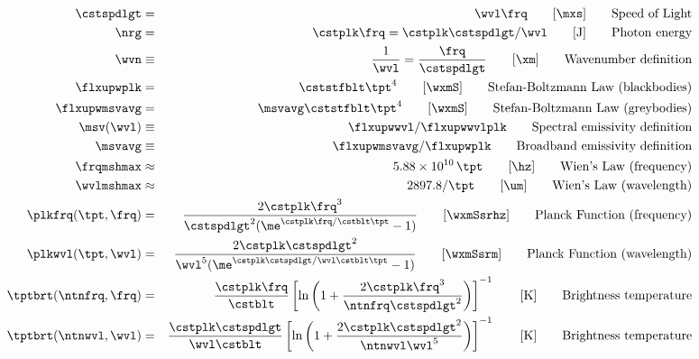 \documentclass[12pt]{article}
\begin{document}
\begin{eqnarray}
\cstspdlgt & = & \wvl \frq \qquad [\mbox{\mxs}] \qquad \mbox{Speed of Light} \nonumber \\ %
\nrg & = & \cstplk \frq = \cstplk \cstspdlgt / \wvl \qquad [\mbox{J}] \qquad \mbox{Photon energy} \nonumber \\ %
\wvn & \equiv & \frac{1}{\wvl} = \frac{\frq}{\cstspdlgt} \nonumber \qquad [\mbox{\xm}] \qquad \mbox{Wavenumber definition} \\ %
\flxupwplk & = & \cststfblt \tpt^{4} \qquad [\mbox{\wxmS}] \qquad \mbox{Stefan-Boltzmann Law (blackbodies)} \nonumber \\ %
\flxupwmsvavg & = & \msvavg \cststfblt \tpt^{4} \qquad [\mbox{\wxmS}] \qquad \mbox{Stefan-Boltzmann Law (greybodies)} \nonumber \\ %
\msv(\wvl) & \equiv & \flxupwwvl/\flxupwwvlplk \nonumber \qquad \mbox{Spectral emissivity definition} \\ %
\msvavg & \equiv & \flxupwmsvavg/\flxupwplk \nonumber \qquad \mbox{Broadband emissivity definition} \\ %
\frqmshmax & \approx & 5.88 \times 10^{10} \, \tpt \qquad [\mbox{\hz}] \qquad \mbox{Wien's Law (frequency)} \nonumber \\ %
\wvlmshmax & \approx & 2897.8 / \tpt \qquad [\mbox{\um}] \qquad \mbox{Wien's Law (wavelength)} \nonumber \\ %
\plkfrq(\tpt,\frq) & = & \frac{2 \cstplk \frq^{3}}
       {\cstspdlgt^{2}( \me^{\cstplk \frq / \cstblt \tpt} - 1)}
       \qquad [\mbox{\wxmSsrhz}] \qquad \mbox{Planck Function (frequency)} \nonumber \\ %
\plkwvl(\tpt,\wvl) & = & \frac{2 \cstplk \cstspdlgt^{2}}
       {\wvl^{5} ( \me^{\cstplk \cstspdlgt / \wvl \cstblt \tpt} - 1)}
       \qquad [\mbox{\wxmSsrm}] \qquad \mbox{Planck Function (wavelength)} \nonumber \\ %
\tptbrt(\ntnfrq,\frq) & = & \frac{\cstplk \frq}{\cstblt}
\left[ \ln \left( 1 + \frac{ 2 \cstplk \frq^{3}}{\ntnfrq \cstspdlgt^{2}} \right) \right]^{-1}
\qquad [\mbox{K}]  \qquad \mbox {Brightness temperature} \nonumber \\ %
\tptbrt(\ntnwvl,\wvl) & = & \frac{\cstplk \cstspdlgt}{\wvl \cstblt}
\left[ \ln \left( 1 + \frac{2 \cstplk \cstspdlgt^{2}}{\ntnwvl \wvl^{5}} \right) \right]^{-1}
\qquad [\mbox{K}]  \qquad \mbox {Brightness temperature} \nonumber %
\label{eqn:xmp_eqn}
\end{eqnarray}
\end{document}
